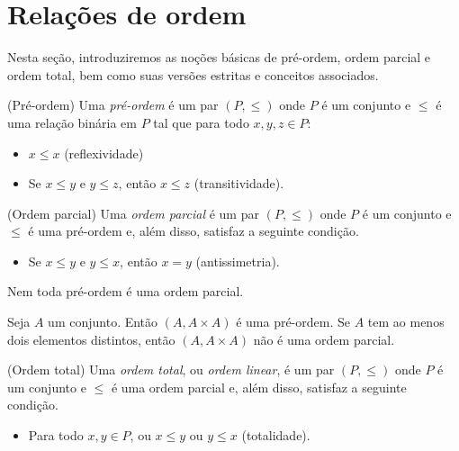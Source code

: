 \section{Relações de ordem}\label{sec:relacoesDeOrdem}
Nesta seção, introduziremos as noções básicas de pré-ordem, ordem parcial e ordem total, bem como suas versões estritas e conceitos associados.

\begin{definition}[$\BST$](Pré-ordem)\label{def:preOrdem}
    Uma \emph{pré-ordem} é um par $(P, \leq)$ onde $P$ é um conjunto e $\leq$ é uma relação binária em $P$ tal que para todo $x, y, z \in P$:
    \begin{itemize}
        \item $x \leq x$ (reflexividade)
        \item Se $x \leq y$ e $y \leq z$, então $x \leq z$ (transitividade).
    \end{itemize}
\end{definition}

\begin{definition}[$\BST$](Ordem parcial)\label{def:ordemParcial}
    Uma \emph{ordem parcial} é um par $(P, \leq)$ onde $P$ é um conjunto e $\leq$ é uma pré-ordem e, além disso, satisfaz a seguinte condição.
    \begin{itemize}
        \item Se $x \leq y$ e $y \leq x$, então $x = y$ (antissimetria).
    \end{itemize}
\end{definition}

Nem toda pré-ordem é uma ordem parcial.
\begin{example}[$\BST$]\label{exa:preOrdemUniversal}
    Seja $A$ um conjunto.
    Então $(A, A\times A)$ é uma pré-ordem.
    Se $A$ tem ao menos dois elementos distintos, então $(A, A\times A)$ não é uma ordem parcial.
\end{example}

\begin{definition}[$\BST$](Ordem total)\label{def:ordemTotal}
    Uma \emph{ordem total}, ou \emph{ordem linear}, é um par $(P, \leq)$ onde $P$ é um conjunto e $\leq$ é uma ordem parcial e, além disso, satisfaz a seguinte condição.
    \begin{itemize}
        \item Para todo $x, y \in P$, ou $x \leq y$ ou $y \leq x$ (totalidade).
    \end{itemize}
\end{definition}

